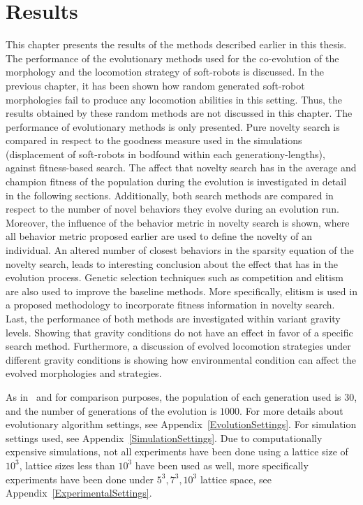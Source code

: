 
\chapter{Results} %

\label{Results} %


This chapter presents the results of the methods described earlier in this thesis. The performance of the evolutionary methods used for the co-evolution of the morphology and the locomotion strategy of soft-robots is discussed. In the previous chapter, it has been shown how random generated soft-robot morphologies fail to produce any locomotion abilities in this setting. Thus, the results obtained by these random methods are not discussed in this chapter. The performance of evolutionary methods is only presented. Pure novelty search is compared in respect to the goodness measure used in the simulations (displacement of soft-robots in bodfound within each generationy-lengths), against fitness-based search. The affect that novelty search has in the average and champion fitness of the population during the evolution is investigated in detail in the following sections. Additionally, both search methods are compared in respect to the number of novel behaviors they evolve during an evolution run. Moreover, the influence of the behavior metric in novelty search is shown, where all behavior metric proposed earlier are used to define the novelty of an individual. An altered number of closest behaviors in the sparsity equation of the novelty search, leads to interesting conclusion about the effect that has in the evolution process. Genetic selection techniques such as competition and elitism are also used to improve the baseline methods. More specifically, elitism is used in a proposed methodology to incorporate fitness information in novelty search. Last, the performance of both methods are investigated within variant gravity levels. Showing that gravity conditions do not have an effect in favor of a specific search method. Furthermore, a discussion of evolved locomotion strategies under different gravity conditions is showing how environmental condition can affect the evolved morphologies and strategies.

As in~\citep{cheney2013unshackling} and for comparison purposes, the population of each generation used is $30$, and the number of generations of the evolution is $1000$. For more details about evolutionary algorithm settings, see Appendix~\ref{EvolutionSettings}. For simulation settings used, see Appendix~\ref{SimulationSettings}. Due to computationally expensive simulations, not all experiments have been done using a lattice size of $10^3$, lattice sizes less than $10^3$ have been used as well, more specifically experiments have been done under $5^3, 7^3, 10^3$ lattice space, see Appendix~\ref{ExperimentalSettings}.



